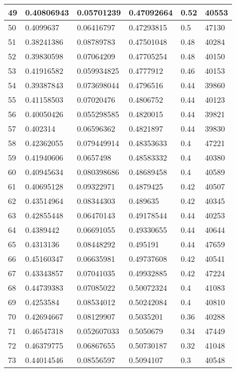 \begin{longtable}{|l|l|l|l|l|l|}
49 & 0.40806943 & 0.05701239 & 0.47092664 & 0.52 & 40553 \\ \hline 
50 & 0.4099637 & 0.06416797 & 0.47293815 & 0.5 & 47130 \\ \hline 
51 & 0.38241386 & 0.08789783 & 0.47501048 & 0.48 & 40284 \\ \hline 
52 & 0.39830598 & 0.07064209 & 0.47705254 & 0.48 & 40150 \\ \hline 
53 & 0.41916582 & 0.059934825 & 0.4777912 & 0.46 & 40153 \\ \hline 
54 & 0.39387843 & 0.073698044 & 0.4796516 & 0.44 & 39860 \\ \hline 
55 & 0.41158503 & 0.07020476 & 0.4806752 & 0.44 & 40123 \\ \hline 
56 & 0.40050426 & 0.055298585 & 0.4820015 & 0.44 & 39821 \\ \hline 
57 & 0.402314 & 0.06596362 & 0.4821897 & 0.44 & 39830 \\ \hline 
58 & 0.42362055 & 0.079449914 & 0.48353633 & 0.4 & 47221 \\ \hline 
59 & 0.41940606 & 0.0657498 & 0.48583332 & 0.4 & 40380 \\ \hline 
60 & 0.40945634 & 0.080398686 & 0.48689458 & 0.4 & 40589 \\ \hline 
61 & 0.40695128 & 0.09322971 & 0.4879425 & 0.42 & 40507 \\ \hline 
62 & 0.43514964 & 0.08344303 & 0.489635 & 0.42 & 40345 \\ \hline 
63 & 0.42855448 & 0.06470143 & 0.49178544 & 0.44 & 40253 \\ \hline 
64 & 0.4389442 & 0.06691055 & 0.49330655 & 0.44 & 40644 \\ \hline 
65 & 0.4313136 & 0.08448292 & 0.495191 & 0.44 & 47659 \\ \hline 
66 & 0.45160347 & 0.06635981 & 0.49737608 & 0.42 & 40541 \\ \hline 
67 & 0.43343857 & 0.07041035 & 0.49932885 & 0.42 & 47224 \\ \hline 
68 & 0.44739383 & 0.07085022 & 0.50072324 & 0.4 & 41083 \\ \hline 
69 & 0.4253584 & 0.08534012 & 0.50242084 & 0.4 & 40810 \\ \hline 
70 & 0.42694667 & 0.08129907 & 0.5035201 & 0.36 & 40288 \\ \hline 
71 & 0.46547318 & 0.052607033 & 0.5050679 & 0.34 & 47449 \\ \hline 
72 & 0.46379775 & 0.06867655 & 0.50730187 & 0.32 & 41048 \\ \hline 
73 & 0.44014546 & 0.08556597 & 0.5094107 & 0.3 & 40548 \\ \hline 

\end{longtable}
